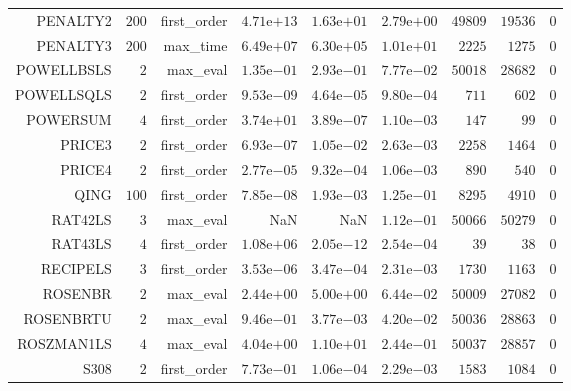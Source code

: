 \begin{longtable}{rrrrrrrrr}
PENALTY2 & \(   200\) & first\_order & \( 4.71\)e\(+13\) & \( 1.63\)e\(+01\) & \( 2.79\)e\(+00\) & \( 49809\) & \( 19536\) & \(     0\) \\
PENALTY3 & \(   200\) & max\_time & \( 6.49\)e\(+07\) & \( 6.30\)e\(+05\) & \( 1.01\)e\(+01\) & \(  2225\) & \(  1275\) & \(     0\) \\
POWELLBSLS & \(     2\) & max\_eval & \( 1.35\)e\(-01\) & \( 2.93\)e\(-01\) & \( 7.77\)e\(-02\) & \( 50018\) & \( 28682\) & \(     0\) \\
POWELLSQLS & \(     2\) & first\_order & \( 9.53\)e\(-09\) & \( 4.64\)e\(-05\) & \( 9.80\)e\(-04\) & \(   711\) & \(   602\) & \(     0\) \\
POWERSUM & \(     4\) & first\_order & \( 3.74\)e\(+01\) & \( 3.89\)e\(-07\) & \( 1.10\)e\(-03\) & \(   147\) & \(    99\) & \(     0\) \\
PRICE3 & \(     2\) & first\_order & \( 6.93\)e\(-07\) & \( 1.05\)e\(-02\) & \( 2.63\)e\(-03\) & \(  2258\) & \(  1464\) & \(     0\) \\
PRICE4 & \(     2\) & first\_order & \( 2.77\)e\(-05\) & \( 9.32\)e\(-04\) & \( 1.06\)e\(-03\) & \(   890\) & \(   540\) & \(     0\) \\
QING & \(   100\) & first\_order & \( 7.85\)e\(-08\) & \( 1.93\)e\(-03\) & \( 1.25\)e\(-01\) & \(  8295\) & \(  4910\) & \(     0\) \\
RAT42LS & \(     3\) & max\_eval &       NaN &       NaN & \( 1.12\)e\(-01\) & \( 50066\) & \( 50279\) & \(     0\) \\
RAT43LS & \(     4\) & first\_order & \( 1.08\)e\(+06\) & \( 2.05\)e\(-12\) & \( 2.54\)e\(-04\) & \(    39\) & \(    38\) & \(     0\) \\
RECIPELS & \(     3\) & first\_order & \( 3.53\)e\(-06\) & \( 3.47\)e\(-04\) & \( 2.31\)e\(-03\) & \(  1730\) & \(  1163\) & \(     0\) \\
ROSENBR & \(     2\) & max\_eval & \( 2.44\)e\(+00\) & \( 5.00\)e\(+00\) & \( 6.44\)e\(-02\) & \( 50009\) & \( 27082\) & \(     0\) \\
ROSENBRTU & \(     2\) & max\_eval & \( 9.46\)e\(-01\) & \( 3.77\)e\(-03\) & \( 4.20\)e\(-02\) & \( 50036\) & \( 28863\) & \(     0\) \\
ROSZMAN1LS & \(     4\) & max\_eval & \( 4.04\)e\(+00\) & \( 1.10\)e\(+01\) & \( 2.44\)e\(-01\) & \( 50037\) & \( 28857\) & \(     0\) \\
S308 & \(     2\) & first\_order & \( 7.73\)e\(-01\) & \( 1.06\)e\(-04\) & \( 2.29\)e\(-03\) & \(  1583\) & \(  1084\) & \(     0\) \\

\end{longtable}
